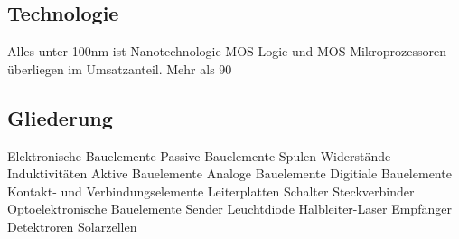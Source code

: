 \subsection{Technologie}
Alles unter 100nm ist Nanotechnologie
MOS Logic und MOS Mikroprozessoren überliegen im Umsatzanteil.
Mehr als 90%

\subsection{Gliederung}

Elektronische Bauelemente
Passive Bauelemente
Spulen
Widerstände
Induktivitäten
Aktive Bauelemente
Analoge Bauelemente
Digitiale Bauelemente
Kontakt- und Verbindungselemente
Leiterplatten
Schalter
Steckverbinder
Optoelektronische Bauelemente
Sender
Leuchtdiode
Halbleiter-Laser
Empfänger
Detektroren
Solarzellen
